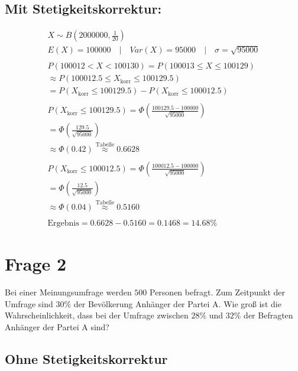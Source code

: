 \subsection{Mit Stetigkeitskorrektur:}

\begin{align*}
    X \sim B(2000000, \frac{1}{20}) \\
    E(X) = 100000 \quad | \quad Var(X) = 95000 \quad | \quad \sigma = \sqrt{95000} \\\\
    P(100012 < X < 100130) = P(100013 \leq X \leq 100129) \\
    \approx P(100012.5 \leq X_{\text{korr}} \leq 100129.5) \\
    = P(X_{\text{korr}} \leq 100129.5) - P(X_{\text{korr}} \leq 100012.5) \\\\
    P(X_{\text{korr}} \leq 100129.5) = \Phi\left(\frac{100129.5 - 100000}{\sqrt{95000}}\right) \\
    = \Phi\left(\frac{129.5}{\sqrt{95000}}\right) \\
    \approx \Phi(0.42) \overset{\text{Tabelle}}{\approx} 0.6628 \\\\
    P(X_{\text{korr}} \leq 100012.5) = \Phi\left(\frac{100012.5 - 100000}{\sqrt{95000}}\right) \\
    = \Phi\left(\frac{12.5}{\sqrt{95000}}\right) \\
    \approx \Phi(0.04) \overset{\text{Tabelle}}{\approx} 0.5160 \\\\
    \text{Ergebnis} = 0.6628 - 0.5160 = 0.1468 = 14.68\%
\end{align*}

\section{Frage 2}

Bei einer Meinungsumfrage werden $500$ Personen befragt. Zum Zeitpunkt der Umfrage sind $30\%$ der Bevölkerung Anhänger der Partei A. Wie groß ist die Wahrscheinlichkeit, dass bei der Umfrage zwischen $28\%$ und $32\%$ der Befragten Anhänger der Partei A sind?

\subsection{Ohne Stetigkeitskorrektur}

